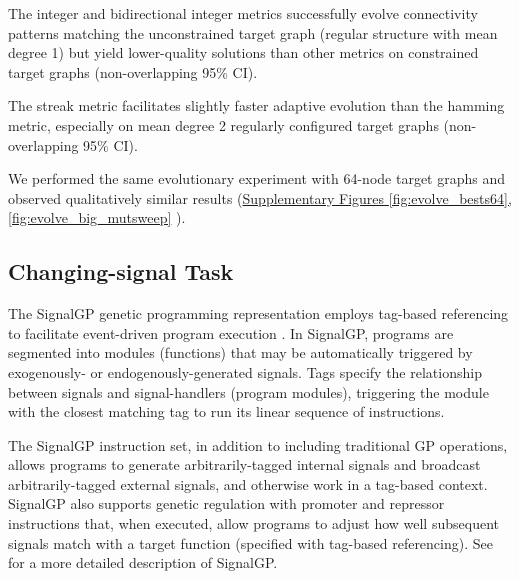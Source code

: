 The integer and bidirectional integer metrics successfully evolve connectivity patterns matching the unconstrained target graph (regular structure with mean degree 1) but yield lower-quality solutions than other metrics on constrained target graphs (non-overlapping 95\% CI).

The streak metric facilitates slightly faster adaptive evolution than the hamming metric, especially on mean degree 2 regularly configured target graphs (non-overlapping 95\% CI).

We performed the same evolutionary experiment with 64-node target graphs and observed qualitatively similar results (\href{doi.org/10.17605/OSF.IO/GW5MC}{Supplementary Figures \ref{fig:evolve_bests64}, \ref{fig:evolve_big_mutsweep}} \cite{Moreno_Ofria_2020}).

\subsection{Changing-signal Task}


The SignalGP genetic programming representation employs tag-based referencing to facilitate event-driven program execution \citep{lalejini2018evolving}.
In SignalGP, programs are segmented into modules (functions) that may be automatically triggered by exogenously- or endogenously-generated signals.
Tags specify the relationship between signals and signal-handlers (program modules), triggering the module with the closest matching tag to run its linear sequence of instructions.

The SignalGP instruction set, in addition to including traditional GP operations, allows programs to generate arbitrarily-tagged internal signals and broadcast arbitrarily-tagged external signals, and otherwise work in a tag-based context.
SignalGP also supports genetic regulation with promoter and repressor instructions that, when executed, allow programs to adjust how well subsequent signals match with a target function (specified with tag-based referencing). %
See \citep{lalejini2018evolving} for a more detailed description of SignalGP.

